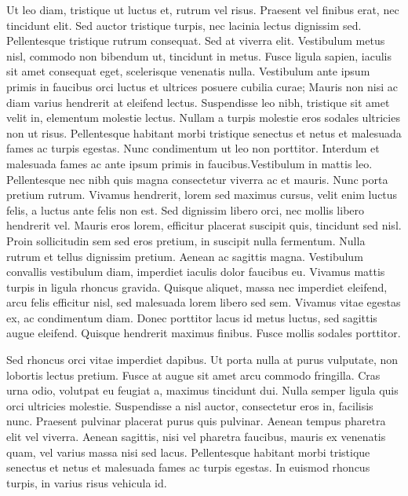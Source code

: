 Ut leo diam, tristique ut luctus et, rutrum vel risus. Praesent vel finibus erat, nec tincidunt elit. Sed auctor tristique turpis, nec lacinia lectus dignissim sed. Pellentesque tristique rutrum consequat. Sed at viverra elit. Vestibulum metus nisl, commodo non bibendum ut, tincidunt in metus. Fusce ligula sapien, iaculis sit amet consequat eget, scelerisque venenatis nulla. Vestibulum ante ipsum primis in faucibus orci luctus et ultrices posuere cubilia curae; Mauris non nisi ac diam varius hendrerit at eleifend lectus. Suspendisse leo nibh, tristique sit amet velit in, elementum molestie lectus. Nullam a turpis molestie eros sodales ultricies non ut risus. Pellentesque habitant morbi tristique senectus et netus et malesuada fames ac turpis egestas. Nunc condimentum ut leo non porttitor. Interdum et malesuada fames ac ante ipsum primis in faucibus.Vestibulum in mattis leo. Pellentesque nec nibh quis magna consectetur viverra ac et mauris. Nunc porta pretium rutrum. Vivamus hendrerit, lorem sed maximus cursus, velit enim luctus felis, a luctus ante felis non est. Sed dignissim libero orci, nec mollis libero hendrerit vel. Mauris eros lorem, efficitur placerat suscipit quis, tincidunt sed nisl. Proin sollicitudin sem sed eros pretium, in suscipit nulla fermentum. Nulla rutrum et tellus dignissim pretium. Aenean ac sagittis magna. Vestibulum convallis vestibulum diam, imperdiet iaculis dolor faucibus eu. Vivamus mattis turpis in ligula rhoncus gravida. Quisque aliquet, massa nec imperdiet eleifend, arcu felis efficitur nisl, sed malesuada lorem libero sed sem. Vivamus vitae egestas ex, ac condimentum diam. Donec porttitor lacus id metus luctus, sed sagittis augue eleifend. Quisque hendrerit maximus finibus. Fusce mollis sodales porttitor.

Sed rhoncus orci vitae imperdiet dapibus. Ut porta nulla at purus vulputate, non lobortis lectus pretium. Fusce at augue sit amet arcu commodo fringilla. Cras urna odio, volutpat eu feugiat a, maximus tincidunt dui. Nulla semper ligula quis orci ultricies molestie. Suspendisse a nisl auctor, consectetur eros in, facilisis nunc. Praesent pulvinar placerat purus quis pulvinar. Aenean tempus pharetra elit vel viverra. Aenean sagittis, nisi vel pharetra faucibus, mauris ex venenatis quam, vel varius massa nisi sed lacus. Pellentesque habitant morbi tristique senectus et netus et malesuada fames ac turpis egestas. In euismod rhoncus turpis, in varius risus vehicula id.

